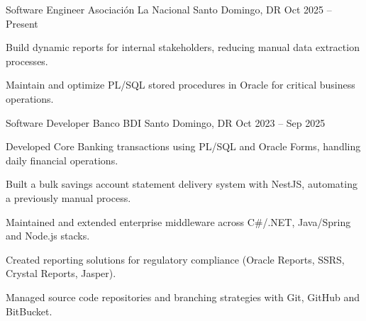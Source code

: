 \documentclass[]{awesome-cv}
\begin{document}
\begin{cventries}
	\cventry
	{Software Engineer}
	{Asociaci\'{o}n La Nacional}
	{Santo Domingo, DR}
	{Oct 2025 -- Present}
	{\begin{cvitems}
		\item {Build dynamic reports for internal stakeholders, reducing manual data extraction processes.}
		\item {Maintain and optimize PL/SQL stored procedures in Oracle for critical business operations.}
		\end{cvitems}}

	\cventry
	{Software Developer}
	{Banco BDI}
	{Santo Domingo, DR}
	{Oct 2023 -- Sep 2025}
	{\begin{cvitems}
		\item {Developed Core Banking transactions using PL/SQL and Oracle Forms, handling daily financial operations.}
		\item {Built a bulk savings account statement delivery system with NestJS, automating a previously manual process.}
		\item {Maintained and extended enterprise middleware across C\#/.NET, Java/Spring and Node.js stacks.}
		\item {Created reporting solutions for regulatory compliance (Oracle Reports, SSRS, Crystal Reports, Jasper).}
		\item {Managed source code repositories and branching strategies with Git, GitHub and BitBucket.}
		\end{cvitems}}
\end{cventries}
\end{document}
